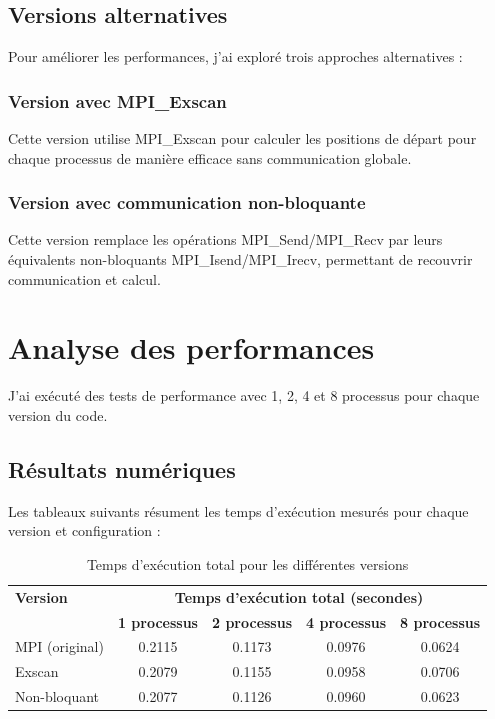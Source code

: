\documentclass[a4paper,11pt]{article}
\begin{document}
\subsection{Versions alternatives}

Pour améliorer les performances, j'ai exploré trois approches alternatives :



\subsubsection{Version avec MPI\_Exscan}
Cette version utilise MPI\_Exscan pour calculer les positions de départ pour chaque processus de manière efficace sans communication globale.

\subsubsection{Version avec communication non-bloquante}
Cette version remplace les opérations MPI\_Send/MPI\_Recv par leurs équivalents non-bloquants MPI\_Isend/MPI\_Irecv, permettant de recouvrir communication et calcul.

\section{Analyse des performances}

J'ai exécuté des tests de performance avec 1, 2, 4 et 8 processus pour chaque version du code.


\subsection{Résultats numériques}

Les tableaux suivants résument les temps d'exécution mesurés pour chaque version et configuration :

\begin{table}[H]
\centering
\begin{tabular}{@{}lcccc@{}}
\toprule
\textbf{Version} & \multicolumn{4}{c}{\textbf{Temps d'exécution total (secondes)}} \\
 & \textbf{1 processus} & \textbf{2 processus} & \textbf{4 processus} & \textbf{8 processus} \\
\midrule
MPI (original) & 0.2115 & 0.1173 & 0.0976 & 0.0624 \\
Exscan & 0.2079 & 0.1155 & 0.0958 & 0.0706 \\
Non-bloquant & 0.2077 & 0.1126 & 0.0960 & 0.0623 \\
\bottomrule
\end{tabular}
\caption{Temps d'exécution total pour les différentes versions}
\label{tab:execution_times}
\end{table}
\end{document}
